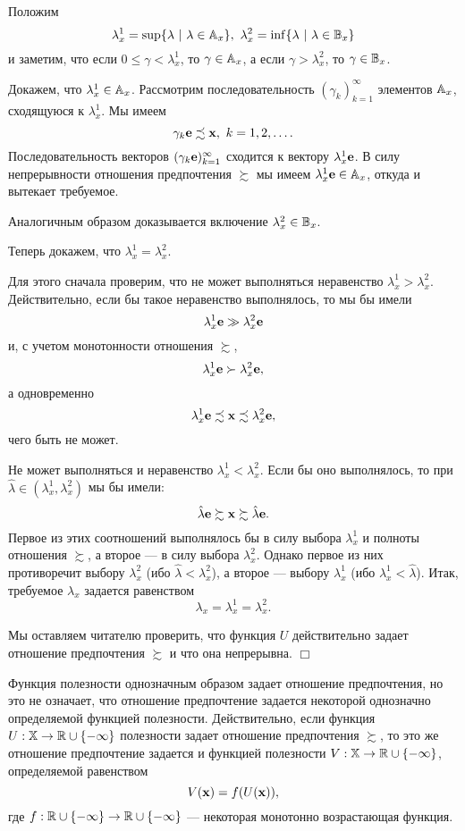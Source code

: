     Положим
    \[\lambda_{x}^{1}=\sup\{\lambda \ | \ \lambda\in\st{A}_{x}\}, \
    \lambda_{x}^{2}=\inf\{\lambda \ | \ \lambda\in\st{B}_{x}\}\]
    и заметим, что если $0\leq\gamma<\lambda_{x}^{1}$, то $\gamma\in\mathbb{A}_{x}$,
    а если $\gamma>\lambda_{x}^{2}$, то $\gamma\in\mathbb{B}_{x}$.

    Докажем, что $\lambda_{x}^{1}\in\mathbb{A}_{x}$.
    Рассмотрим последовательность
    $(\gamma_{k})_{k=1}^{\infty}$ элементов $\mathbb{A}_{x}$, сходящуюся к
    $\lambda_{x}^{1}$. Мы имеем
    \[\gamma_{k}\vc{e}\precsim\vc{x}, \ k=1,2,\ldots .\]
    Последовательность векторов $(\gamma_{k}\mathbf{e})_{k=1}^{\infty}$
    сходится к вектору $\lambda_{x}^{1}\mathbf{e}$. В силу непрерывности
    отношения предпочтения $\succsim$ мы имеем
    $\lambda_{x}^{1}\mathbf{e}\in\mathbb{A}_{x}$, откуда и вытекает требуемое.

    Аналогичным образом доказывается включение $\lambda_{x}^{2}\in\mathbb{B}_{x}$.

    Теперь докажем, что $\lambda_{x}^{1}=\lambda_{x}^{2}$.

    Для этого
    сначала проверим, что не может выполняться неравенство
    $\lambda_{x}^{1}>\lambda_{x}^{2}$. Действительно, если бы такое
    неравенство выполнялось, то мы бы имели
    \[\lambda_{x}^{1}\mathbf{e}\gg\lambda_{x}^{2}\mathbf{e}\]
    и, с учетом монотонности отношения $\succsim$,
    \[\lambda_{x}^{1}\mathbf{e}\succ\lambda_{x}^{2}\mathbf{e},\]
    а одновременно
    \[\lambda_{x}^{1}\mathbf{e}\precsim\mathbf{x}\precsim\lambda_{x}^{2}\mathbf{e},\]
    чего быть не может.

    Не может выполняться и неравенство
    $\lambda_{x}^{1}<\lambda_{x}^{2}$. Если бы оно выполнялось, то
    при $\hat{\lambda}\in(\lambda_{x}^{1},\lambda_{x}^{2})$ мы бы
    имели:
    \[\hat{\lambda}\mathbf{e}\succsim\mathbf{x}\succsim\hat{\lambda}\mathbf{e}.\]
    Первое из этих соотношений выполнялось бы в силу выбора $\lambda_{x}^{1}$ и полноты
    отношения $\succsim$, а второе --- в силу выбора
     $\lambda_{x}^{2}$. Однако первое из них
     противоречит выбору $\lambda_{x}^{2}$ (ибо $\hat{\lambda}<\lambda_{x}^{2}$), а
     второе --- выбору $\lambda_{x}^{1}$ (ибо
     $\lambda_{x}^{1}<\hat{\lambda}$).
     Итак, требуемое $\lambda_{x}$ задается равенством
     \[\lambda_{x}=\lambda_{x}^{1}=\lambda_{x}^{2}.\]

     Мы оставляем читателю проверить, что функция $U$ действительно
     задает отношение предпочтения $\succsim$ и что она непрерывна.
     $\Box$

    Функция полезности однозначным образом задает отношение
    предпочтения, но это не означает, что отношение предпочтение
    задается некоторой однозначно определяемой функцией полезности.
    Действительно, если функция $U:\mathbb{X}\rightarrow
    \mathbb{R}\cup\{-\infty\}$ полезности задает отношение предпочтения
    $\succsim$, то это же отношение предпочтение задается и
    функцией полезности $V:\mathbb{X}\rightarrow
    \mathbb{R}\cup\{-\infty\}$, определяемой равенством
    \[V(\mathbf{x})=f(U(\mathbf{x})),\]
    где $f:\mathbb{R}\cup\{-\infty\}\rightarrow \mathbb{R}\cup\{-\infty\}$ ---
    некоторая монотонно возрастающая функция.


